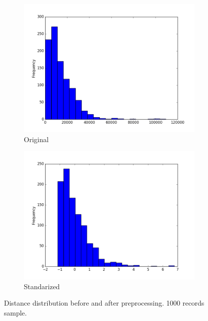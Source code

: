 \documentclass{article}
\begin{document}
\begin{figure}[H]
  \centering
  \begin{subfigure}[b]{.45\textwidth}
  	\centering
  	\includegraphics[width=\linewidth]{./images/distance_hist.png}
  	\caption{Original}
  \end{subfigure}
  \begin{subfigure}[b]{.45\textwidth}
  	\centering
  	\includegraphics[width=\linewidth]{./images/distance_standarized_hist.png}
  	\caption{Standarized}
  \end{subfigure}
  \caption{Distance distribution before and after preprocessing. 1000 records sample.}
  	\label{fig:preprocessing/distance}
\end{figure}
 
\end{document}
